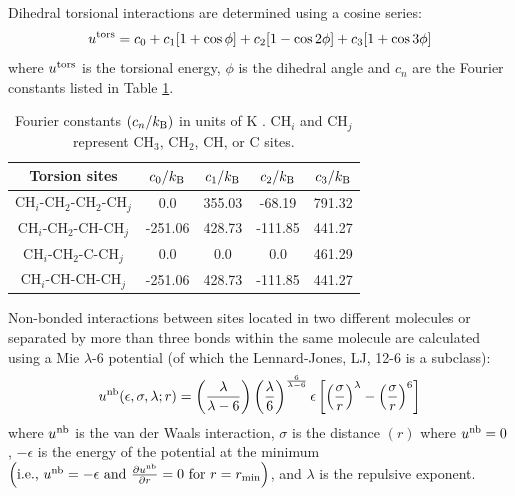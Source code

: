 \documentclass[journal=jced,manuscript=article]{achemso}
\begin{document}
    Dihedral torsional interactions are determined using a cosine series:
    \begin{equation}
    u^{\rm tors} = c_0 + c_1 [1+\cos{\phi}] + c_2 [1-\cos{2\phi}] + c_3 [1+\cos{3\phi}]
    \end{equation}
    where $u^{\rm tors}$ is the torsional energy, $\phi$ is the dihedral angle and $c_n$ are the Fourier constants listed in Table \ref{tab:torsions}.
    
    \begin{table}[h!]
    	\caption{Fourier constants $(c_n/k_{\rm B})$ in units of K \cite{Martin1999}. CH$_i$ and CH$_j$ represent CH$_3$, CH$_2$, CH, or C sites.} \label{tab:torsions}
    	\begin{center}
    		\begin{tabular}{|c|c|c|c|c|}
    			\hline
    			Torsion sites & $c_0/k_{\rm B}$ & $c_1/k_{\rm B}$ & $c_2/k_{\rm B}$ & $c_3/k_{\rm B}$ \\ \hline
    			CH$_i$-CH$_2$-CH$_2$-CH$_j$ & 0.0 & 355.03 & -68.19 & 791.32 \\ 
    			CH$_i$-CH$_2$-CH-CH$_j$ & -251.06 & 428.73 & -111.85 & 441.27 \\
    			CH$_i$-CH$_2$-C-CH$_j$ & 0.0 & 0.0 & 0.0 & 461.29 \\
    			CH$_i$-CH-CH-CH$_j$ & -251.06 & 428.73 & -111.85 & 441.27 \\
    			\hline
    		\end{tabular}
    	\end{center} 
    \end{table}
    
    Non-bonded interactions between sites located in two different molecules or separated by more than three bonds within the same molecule are calculated using a Mie $\lambda$-6 potential (of which the Lennard-Jones, LJ, 12-6 is a subclass):
    \begin{equation} \label{eq:Mie}
    u^{\rm nb}(\epsilon,\sigma,\lambda;r) = \left(\frac{\lambda}{\lambda - 6}\right)\left(\frac{\lambda}{6}\right)^{\frac{6}{\lambda - 6}} \epsilon \left[\left(\frac{\sigma}{r}\right)^{\lambda} - \left(\frac{\sigma}{r}\right)^6\right]
    \end{equation} 
    where $u^{\rm nb}$ is the van der Waals interaction, $\sigma$ is the distance $(r)$ where $u^{\rm nb} = 0$, $-\epsilon$ is the energy of the potential at the minimum $\left(\text{i.e., }u^{\rm nb} = -\epsilon \text{ and } \frac{\partial u^{\rm nb}}{\partial r} = 0 \text{ for } r=r_{\rm min} \right)$, and $\lambda$ is the repulsive exponent. 
    
\end{document}
